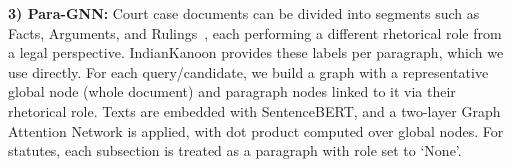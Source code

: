 \noindent \textbf{3) Para-GNN:} 
Court case documents can be divided into segments such as Facts, Arguments, and Rulings~\citep{malik-rr-2021}, each performing a different rhetorical role from a legal perspective. IndianKanoon provides these labels per paragraph, which we use directly. For each query/candidate, we build a graph with a representative global node (whole document) and paragraph nodes linked to it via their rhetorical role. Texts are embedded with SentenceBERT, and a two-layer Graph Attention Network is applied, with dot product computed over global nodes. For statutes, each subsection is treated as a paragraph with role set to `None'.




